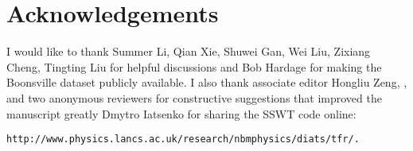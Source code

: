 \section{Acknowledgements}
I would like to thank Summer Li, Qian Xie, Shuwei Gan, Wei Liu, Zixiang Cheng, Tingting Liu for helpful discussions\new{,} and Bob Hardage for making the Boonsville dataset publicly available.  I also thank associate editor Hongliu Zeng, , and two anonymous reviewers for constructive suggestions that improved the manuscript greatly Dmytro Iatsenko for sharing the SSWT code online: 
\begin{verbatim}
http://www.physics.lancs.ac.uk/research/nbmphysics/diats/tfr/.
\end{verbatim}
\newpage

\listoffigures









